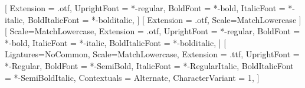 \usepackage[english]{babel}

\usepackage{amsmath,amssymb,amsfonts}
\usepackage[utf8]{inputenc}

\usepackage{fontspec}
\usepackage{unicode-math}
\setmainfont{texgyretermes}[
	Extension = .otf,
	UprightFont = *-regular,
	BoldFont = *-bold,
	ItalicFont = *-italic,
	BoldItalicFont = *-bolditalic,
]
[
	Extension = .otf,
	Scale=MatchLowercase
]
\setsansfont{texgyreheros}[
	Scale=MatchLowercase,
	Extension = .otf,
	UprightFont = *-regular,
	BoldFont = *-bold,
	ItalicFont = *-italic,
	BoldItalicFont = *-bolditalic,
]
\setmonofont{JuliaMono}[
	Ligatures=NoCommon,
	Scale=MatchLowercase,
	Extension = .ttf,
	UprightFont = *-Regular,
	BoldFont = *-SemiBold,
	ItalicFont = *-RegularItalic,
	BoldItalicFont = *-SemiBoldItalic,
	Contextuals = Alternate,
	CharacterVariant = 1,
]

\usepackage{lastpage}

\usepackage{gensymb}

\usepackage{setspace}

\usepackage{ccicons}

\usepackage[hang,flushmargin]{footmisc}

\usepackage{geometry}

\setlength{\parindent}{0pt}
\setlength{\parskip}{6pt plus 2pt minus 1pt}

\usepackage{fancyhdr}
\renewcommand{\headrulewidth}{0pt}